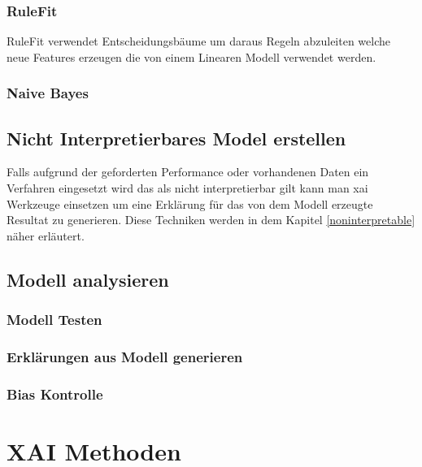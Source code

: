 \documentclass[
  12pt, %
  a4paper, %
  oneside, %
  openany, 
  numbers=noenddot, %
  BCOR=5mm, %
  parskip=half*, %
  thesis, %
]{bfhbook}
\begin{document}
\subsection{RuleFit}
RuleFit \parencite{Friedman2008} verwendet Entscheidungsbäume um daraus Regeln abzuleiten welche neue Features erzeugen die von einem Linearen Modell verwendet werden. 
\subsection{Naive Bayes}

\section{Nicht Interpretierbares Model erstellen}
Falls aufgrund der geforderten Performance oder vorhandenen Daten ein Verfahren eingesetzt wird das als nicht interpretierbar gilt kann man \Gls{xai} Werkzeuge einsetzen um eine Erklärung für das von dem Modell erzeugte Resultat zu generieren. Diese Techniken werden in dem Kapitel \ref{noninterpretable} näher erläutert.

\section{Modell analysieren}

\subsection{Modell Testen}

\subsection{Erklärungen aus Modell generieren}

\subsection{Bias Kontrolle}

\chapter{XAI Methoden}
\end{document}
